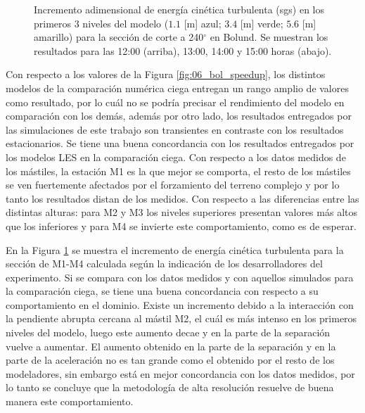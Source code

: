 \begin{figure}[H]
	\caption{Incremento adimensional de energía cinética turbulenta (sgs) en los primeros 3 niveles del modelo ($1.1$ [m] azul; $3.4$ [m] verde; $5.6$ [m] amarillo) para la sección de corte a 240$^\circ$ en Bolund. Se muestran los resultados para las 12:00 (arriba), 13:00, 14:00 y 15:00 horas (abajo).}
	\label{fig:06_bol_tke}
\end{figure}
Con respecto a los valores de la Figura \ref{fig:06_bol_speedup}, los distintos modelos de la comparación numérica ciega entregan un rango amplio de valores como resultado, por lo cuál no se podría precisar el rendimiento del modelo en comparación con los demás, además por otro lado, los resultados entregados por las simulaciones de este trabajo son transientes en contraste con los resultados estacionarios. Se tiene una buena concordancia con los resultados entregados por los modelos LES en la comparación ciega. Con respecto a los datos medidos de los mástiles, la estación M1 es la que mejor se comporta, el resto de los mástiles se ven fuertemente afectados por el forzamiento del terreno complejo y por lo tanto los resultados distan de los medidos. Con respecto a las diferencias entre las distintas alturas: para M2 y M3 los niveles superiores presentan valores más altos que los inferiores y para M4 se invierte este comportamiento, como es de esperar. 

En la Figura \ref{fig:06_bol_tke} se muestra el incremento de energía cinética turbulenta para la sección de M1-M4 calculada según la indicación de los desarrolladores del experimento. Si se compara con los datos medidos y con aquellos simulados para la comparación ciega, se tiene una buena concordancia con respecto a su comportamiento en el dominio. Existe un incremento debido a la interacción con la pendiente abrupta cercana al mástil M2, el cuál es más intenso en los primeros niveles del modelo, luego este aumento decae y en la parte de la separación vuelve a aumentar. El aumento obtenido en la parte de la separación y en la parte de la aceleración no es tan grande como el obtenido por el resto de los modeladores, sin embargo está en mejor concordancia con los datos medidos, por lo tanto se concluye que la metodología de alta resolución resuelve de buena manera este comportamiento.

